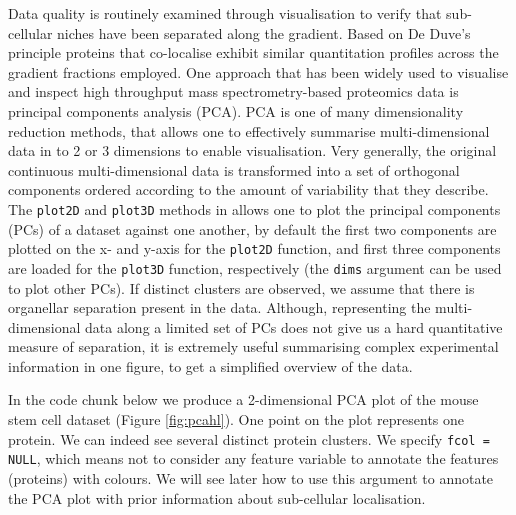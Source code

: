 Data quality is routinely examined through visualisation to verify
that sub-cellular niches have been separated along the gradient. Based
on De Duve's principle \cite{DeDuve:1981} proteins that co-localise
exhibit similar quantitation profiles across the gradient fractions
employed. One approach that has been widely used to visualise and
inspect high throughput mass spectrometry-based proteomics data is
principal components analysis (PCA). PCA is one of many dimensionality
reduction methods, that allows one to effectively summarise
multi-dimensional data in to 2 or 3 dimensions to enable
visualisation. Very generally, the original continuous
multi-dimensional data is transformed into a set of orthogonal
components ordered according to the amount of variability that they
describe. The \texttt{plot2D} and \texttt{plot3D} methods in  allows one to
plot the principal components (PCs) of a dataset against one another,
by default the first two components are plotted on the x- and y-axis
for the \texttt{plot2D} function, and first three components are
loaded for the \texttt{plot3D} function, respectively (the
\texttt{dims} argument can be used to plot other PCs). If
distinct clusters are observed, we assume that there is organellar
separation present in the data. Although, representing the
multi-dimensional data along a limited set of PCs does not give us a
hard quantitative measure of separation, it is extremely useful
summarising complex experimental information in one figure, to get a
simplified overview of the data.

In the code chunk below we produce a 2-dimensional PCA plot of the mouse stem cell
dataset (Figure \ref{fig:pcahl}). One point on the plot represents one
protein. We can indeed see several distinct protein clusters. We
specify \texttt{fcol = NULL}, which means not to consider any feature
variable to annotate the features (proteins) with colours. We will see
later how to use this argument to annotate the PCA plot with prior information
about sub-cellular localisation.

